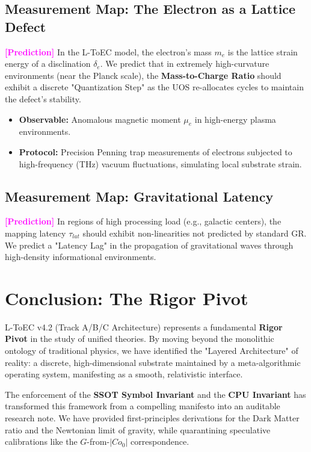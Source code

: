 \documentclass[11pt,titlepage]{article}
\newcommand{\tagpred}{\textcolor{magenta}{\textbf{[Prediction]}} }
\begin{document}
\subsection{Measurement Map: The Electron as a Lattice Defect}
\tagpred In the L-ToEC model, the electron's mass $m_e$ is the lattice strain energy of a disclination $\delta_e$. We predict that in extremely high-curvature environments (near the Planck scale), the \textbf{Mass-to-Charge Ratio} should exhibit a discrete "Quantization Step" as the UOS re-allocates cycles to maintain the defect's stability.
\begin{itemize}
    
\item \textbf{Observable:} Anomalous magnetic moment $\mu_e$ in high-energy plasma environments.
    
\item \textbf{Protocol:} Precision Penning trap measurements of electrons subjected to high-frequency (THz) vacuum fluctuations, simulating local substrate strain.
\end{itemize}

\subsection{Measurement Map: Gravitational Latency}
\tagpred In regions of high processing load (e.g., galactic centers), the mapping latency $\tau_{lat}$ should exhibit non-linearities not predicted by standard GR. We predict a "Latency Lag" in the propagation of gravitational waves through high-density informational environments.

\section{Conclusion: The Rigor Pivot}
L-ToEC v4.2 (Track A/B/C Architecture) represents a fundamental \textbf{Rigor Pivot} in the study of unified theories. By moving beyond the monolithic ontology of traditional physics, we have identified the "Layered Architecture" of reality: a discrete, high-dimensional substrate maintained by a meta-algorithmic operating system, manifesting as a smooth, relativistic interface.

The enforcement of the \textbf{SSOT Symbol Invariant} and the \textbf{CPU Invariant} has transformed this framework from a compelling manifesto into an auditable research note. We have provided first-principles derivations for the Dark Matter ratio and the Newtonian limit of gravity, while quarantining speculative calibrations like the $G$-from-$|Co_0|$ correspondence.
\end{document}
